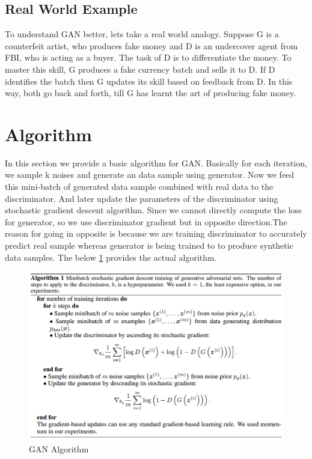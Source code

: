 \subsection{Real World Example}
To understand GAN better, lets take a real world analogy. Suppose G is a counterfeit artist, who produces fake money and D is an undercover agent from FBI, who is acting as a buyer. The task of D is to differentiate the money. To master this skill, G produces a fake currency batch and sells it to D. If D identifies the batch then G updates its skill based on feedback from D. %
In this way, both go back and forth, till G has learnt the art of producing fake money.
\section{Algorithm}
In this section we provide a basic algorithm for GAN. Basically for each iteration, we sample k noises and generate an data sample using generator. Now we feed this mini-batch of generated data sample combined with real data to the discriminator. And later update the parameters of the discriminator using stochastic gradient descent algorithm. Since we cannot directly compute the loss for generator, so we use discriminator gradient but in opposite direction.The reason for going in opposite is because we are training discriminator to accurately predict real sample whereas generator is being trained to to produce synthetic data samples. The below \cref{fig:GAN Algorithm} provides the actual algorithm.
\begin{figure}[!htb]

  \centering
    \includegraphics[scale=.4, angle=0]{Files/Algorithm.png}
    \caption[Vanilla GAN Algorithm]{ GAN Algorithm\cite{Gan-overview}}
    \label{fig:GAN Algorithm}
\end{figure}


